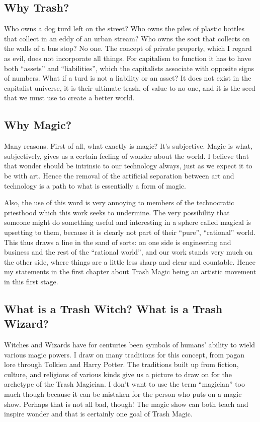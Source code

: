 \subsection{Why Trash?}\label{why-trash}

Who owns a dog turd left on the street? Who owns the piles of plastic
bottles that collect in an eddy of an urban stream? Who owns the soot
that collects on the walls of a bus stop? No one. The concept of private
property, which I regard as evil, does not incorporate all things. For
capitalism to function it has to have both ``assets'' and
``liabilities'', which the capitalists associate with opposite signs of
numbers. What if a turd is not a liability or an asset? It does not
exist in the capitalist universe, it is their ultimate trash, of value
to no one, and it is the seed that we must use to create a better world.

\subsection{Why Magic?}\label{why-magic}

Many reasons. First of all, what exactly is magic? It's subjective.
Magic is what, subjectively, gives us a certain feeling of wonder about
the world. I believe that that wonder should be intrinsic to our
technology always, just as we expect it to be with art. Hence the
removal of the artificial separation between art and technology is a
path to what is essentially a form of magic.

Also, the use of this word is very annoying to members of the
technocratic priesthood which this work seeks to undermine. The very
possibility that someone might do something useful and interesting in a
sphere called magical is upsetting to them, because it is clearly not
part of their ``pure'', ``rational'' world. This thus draws a line in
the sand of sorts: on one side is engineering and business and the rest
of the ``rational world'', and our work stands very much on the other
side, where things are a little less sharp and clear and countable.
Hence my statements in the first chapter about Trash Magic being an
artistic movement in this first stage.

\subsection{What is a Trash Witch? What is a Trash
Wizard?}\label{what-is-a-trash-witch-what-is-a-trash-wizard}

Witches and Wizards have for centuries been symbols of humans' ability
to wield various magic powers. I draw on many traditions for this
concept, from pagan lore through Tolkien and Harry Potter. The
traditions built up from fiction, culture, and religions of various
kinds give us a picture to draw on for the archetype of the Trash
Magician. I don't want to use the term ``magician'' too much though
because it can be mistaken for the person who puts on a magic show.
Perhaps that is not all bad, though! The magic show can both teach and
inspire wonder and that is certainly one goal of Trash Magic.

